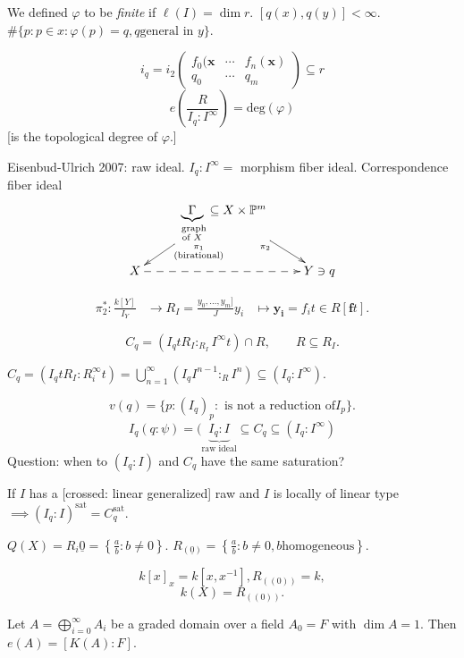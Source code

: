 We defined $\varphi$ to be {\it finite} if
$\ell(I) = \dim r$.
$[q(x),q(y)]<\infty$.
$\#\{p : p \in x: \varphi(p) = q,q\text{
general in }y\}$.

$$
i_q=i_2
\begin{pmatrix} f_0(\mathbf{x}&  \cdots &
f_n(\mathbf{x})\\
q_0& \cdots & q_m \end{pmatrix}
\subseteq r
$$
$$
e\left(\frac{R}{I_q:I^\infty}\right)
=\text{deg}(\varphi)
$$
[is the topological degree of $\varphi$.]

Eisenbud-Ulrich 2007: raw ideal.
$I_q:I^\infty=$ morphism fiber ideal.
Correspondence fiber ideal
$$
\xymatrix{
&\underbrace{\Gamma}_{\substack{\text{
graph} \\ \text{of }X}} \subseteq X
\times\mathbb{P}^m
\ar[dr]_{\pi_2}\ar[dl]^{\substack{\pi_1 \\
\text{(birational)}}}\\
X \ar@{-->}[rr]& & Y \ni q
}
$$

$$
\begin{aligned}
\pi_2^* :\frac{k[Y]}{I_Y}&\to
R_I=\frac{y_0,…,y_m]}{J}
y_i&\longmapsto \mathbf{y_i}=f_it \in
R[\mathbf{f}t].
\end{aligned}
$$

$$
C_q=(I_qtR_I :_{R_I}I^{\infty}t) \cap R,
\qquad  R \subseteq R_I.
$$
\begin{exercise}
\label{exercise-raw-ideal}
$C_q=(I_qtR_I:R_i^{\infty}t)
=\bigcup_{n=1}^\infty (I_q I^{n-1}:_R I^n)
\subseteq(I_q:I^\infty)$.
\end{exercise}

$$
v(q)=\{p:(I_q)_p:\text{ is not a reduction of
$I_p$}\}.
$$
$$
I_q(q:\psi)=(\underbrace{I_q:I}_{\text{raw
ideal}}
\subseteq C_q \subseteq (I_q:I^\infty)
$$
Question: when to $(I_q:I)$ and $C_q$ have
the
same saturation?

If $I$ has a [crossed: linear generalized]
raw
 and $I$ is locally of linear type
$\implies
(I_q:I)^{\text{sat}}=C_q^{\text{sat}}$.




\medskip{}
$Q(X)=R_i{\underline{0}}=\left\{\frac{a}{b}:
b\neq
0\right\}$.
$R_{(\underline{0})}=\left\{\frac{a}{b}:b\neq
0,b\text{
homogeneous}\right\}$.

 $$
k[x]_x=k[x,x^{-1}], R_{((0))}=k,
$$
$$
k(X)=R_{((0))}.
$$

\begin{lemma}
\label{lemma-degree}
Let $A = \bigoplus_{i=0}^\infty A_i$
be a graded domain over a field $A_0=F$
with $\dim A=1$.
Then $e(A)=[K(A):F]$.
\end{lemma}

